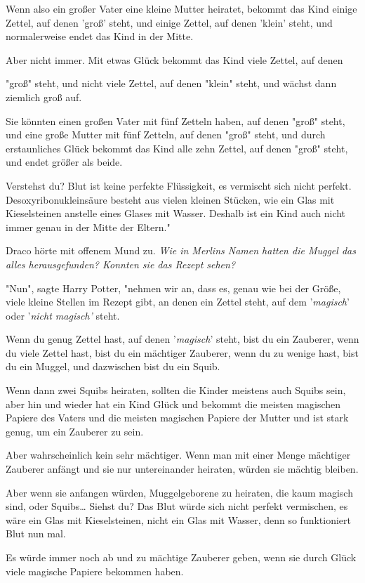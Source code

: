 {Wenn also ein großer Vater eine kleine Mutter heiratet, bekommt das Kind einige Zettel, auf denen 'groß' steht, und einige Zettel, auf denen 'klein' steht, und normalerweise endet das Kind in der Mitte.

Aber nicht immer. Mit etwas Glück bekommt das Kind viele Zettel, auf denen

"groß" steht, und nicht viele Zettel, auf denen "klein" steht, und wächst dann ziemlich groß auf.

Sie könnten einen großen Vater mit fünf Zetteln haben, auf denen "groß" steht, und eine große Mutter mit fünf Zetteln, auf denen "groß" steht, und durch erstaunliches Glück bekommt das Kind alle zehn Zettel, auf denen "groß" steht, und endet größer als beide.

Verstehst du? Blut ist keine perfekte Flüssigkeit, es vermischt sich nicht perfekt. Desoxyribonukleinsäure besteht aus vielen kleinen Stücken, wie ein Glas mit Kieselsteinen anstelle eines Glases mit Wasser. Deshalb ist ein Kind auch nicht immer genau in der Mitte der Eltern."

Draco hörte mit offenem Mund zu. \emph{Wie in Merlins Namen hatten die Muggel das alles herausgefunden? Konnten sie das Rezept sehen?}

"Nun", sagte Harry Potter, "nehmen wir an, dass es, genau wie bei der Größe, viele kleine Stellen im Rezept gibt, an denen ein Zettel steht, auf dem '\emph{magisch}' oder '\emph{nicht magisch'} steht.

Wenn du genug Zettel hast, auf denen '\emph{magisch}' steht, bist du ein Zauberer, wenn du viele Zettel hast, bist du ein mächtiger Zauberer, wenn du zu wenige hast, bist du ein Muggel, und dazwischen bist du ein Squib.

Wenn dann zwei Squibs heiraten, sollten die Kinder meistens auch Squibs sein, aber hin und wieder hat ein Kind Glück und bekommt die meisten magischen Papiere des Vaters und die meisten magischen Papiere der Mutter und ist stark genug, um ein Zauberer zu sein.

Aber wahrscheinlich kein sehr mächtiger. Wenn man mit einer Menge mächtiger Zauberer anfängt und sie nur untereinander heiraten, würden sie mächtig bleiben.

Aber wenn sie anfangen würden, Muggelgeborene zu heiraten, die kaum magisch sind, oder Squibs… Siehst du? Das Blut würde sich nicht perfekt vermischen, es wäre ein Glas mit Kieselsteinen, nicht ein Glas mit Wasser, denn so funktioniert Blut nun mal.

Es würde immer noch ab und zu mächtige Zauberer geben, wenn sie durch Glück viele magische Papiere bekommen haben.

}
